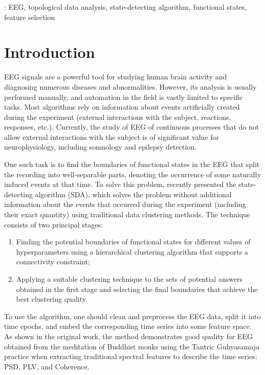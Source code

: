 \documentclass[10pt]{iopart}
\begin{document}
\vspace{2pc}
: EEG, topological data analysis, state-detecting algorithm, functional states, feature selection

\submitto{\JNE}

\ioptwocol{}

\section{Introduction}

EEG signals are a powerful tool for studying human brain activity and diagnosing numerous diseases and abnormalities. However, its analysis is usually performed manually, and automation in the field is vastly limited to specific tasks. Most algorithms rely on information about events artificially created during the experiment (external interactions with the subject, reactions, responses, etc.). Currently, the study of EEG of continuous processes that do not allow external interactions with the subject is of significant value for neurophysiology, including somnology and epilepsy detection.

One such task is to find the boundaries of functional states in the EEG that split the recording into well-separable parts, denoting the occurrence of some naturally induced events at that time. To solve this problem, \cite{SDA} recently presented the state-detecting algorithm (SDA), which solves the problem without additional information about the events that occurred during the experiment (including their exact quantity) using traditional data clustering methods. The technique consists of two principal stages:
\begin{enumerate}
    \item
        Finding the potential boundaries of functional states for different values of hyperparameters using a hierarchical clustering algorithm that supports a connectivity constraint;
    \item
        Applying a suitable clustering technique to the sets of potential answers obtained in the first stage and selecting the final boundaries that achieve the best clustering quality.
\end{enumerate}


To use the algorithm, one should clean and preprocess the EEG data, split it into time epochs, and embed the corresponding time series into some feature space. As shown in the original work, the method demonstrates good quality for EEG obtained from the meditation of Buddhist monks using the Tantric Guhyasamaja practice when extracting traditional spectral features to describe the time series: PSD, PLV, and Coherence.
\end{document}
